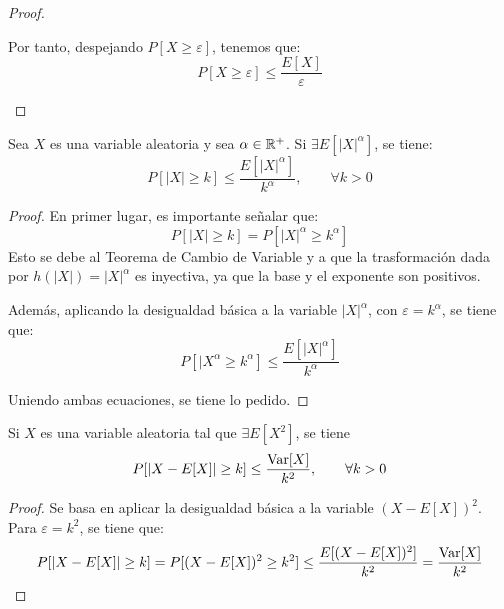 \begin{proof}
\begin{itemize}
        Por tanto, despejando $P[X\geq \varepsilon]$, tenemos que:
        \begin{equation*}
            P[X\geq \varepsilon] \leq \frac{E[X]}{\varepsilon}
        \end{equation*}
    \end{itemize}
\end{proof}

\begin{coro}
    Sea $X$ es una variable aleatoria y sea $\alpha\in \mathbb{R}^+$. Si $\exists E[|X|^\alpha]$, se tiene:
    \begin{equation*}
        P[|X|\geq k]\leq \frac{E[|X|^\alpha]}{k^\alpha},\qquad \forall k>0
    \end{equation*}
\end{coro}
\begin{proof}
    En primer lugar, es importante señalar que:
    \begin{equation*}
        P[|X|\geq k]=P[|X|^\alpha \geq k^\alpha]
    \end{equation*}
    Esto se debe al Teorema de Cambio de Variable y a que la trasformación dada por $h(|X|)=|X|^\alpha$ es inyectiva, ya que la base y el exponente son positivos.

    Además, aplicando la desigualdad básica a la variable $|X|^\alpha$, con $\varepsilon=k^\alpha$, se tiene que:
    \begin{equation*}
        P[|X^\alpha\geq k^\alpha]\leq \frac{E[|X|^\alpha]}{k^\alpha}
    \end{equation*}

    Uniendo ambas ecuaciones, se tiene lo pedido.
\end{proof}

\begin{coro}
    Si $X$ es una variable aleatoria tal que $\exists E[X^2]$, se tiene
    \begin{equation*}
        P[|X-E[X]|\geq k]\leq \frac{\operatorname{Var}[X]}{k^2},\qquad \forall k>0
    \end{equation*}
\end{coro}
\begin{proof}
    Se basa en aplicar la desigualdad básica a la variable $(X-E[X])^2$. Para $\varepsilon=k^2$, se tiene que:
    \begin{equation*}
        P[|X-E[X]|\geq k] = P[(X-E[X])^2\geq k^2] \leq \frac{E[(X-E[X])^2]}{k^2} = \frac{\operatorname{Var}[X]}{k^2}
    \end{equation*}
\end{proof}

